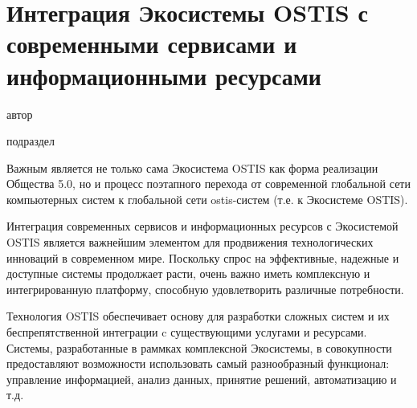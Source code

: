 \chapter{Интеграция Экосистемы OSTIS с современными сервисами и информационными ресурсами}
{\label{chapter_integration}}

\vspace{-7\baselineskip}

\begin{SCn}
\begin{scnrelfromlist}{автор}
\end{scnrelfromlist}

\bigskip


\bigskip

\begin{scnrelfromlist}{подраздел}
\end{scnrelfromlist}

\end{SCn}

Важным является не только сама Экосистема OSTIS как форма реализации Общества 5.0, но и процесс поэтапного перехода от современной глобальной сети компьютерных систем к глобальной сети ostis-систем (т.е. к Экосистеме OSTIS).

Интеграция современных сервисов и информационных ресурсов с Экосистемой OSTIS является важнейшим элементом для продвижения технологических инноваций в современном мире. Поскольку спрос на эффективные, надежные и доступные системы продолжает расти, очень важно иметь комплексную и интегрированную платформу, способную удовлетворить различные потребности.

Технология OSTIS обеспечивает основу для разработки сложных систем и их беспрепятственной интеграции c существующими услугами и ресурсами. Системы, разработанные в раммках комплексной Экосистемы, в совокупности предоставляют возможности использовать самый разнообразный функционал: управление информацией, анализ данных, принятие решений, автоматизацию и т.д.

